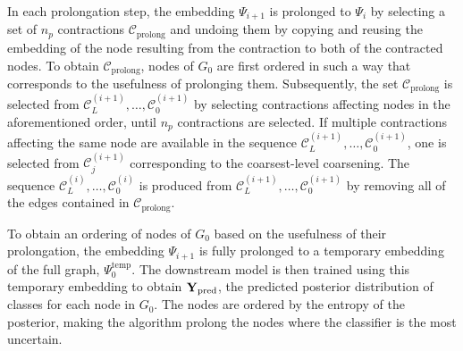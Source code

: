 In each prolongation step, the embedding \( \Psi_{i + 1} \) is prolonged to \( \Psi_i \) by selecting a set of \( n_p \) contractions \( \mathcal{C}_\mathrm{prolong} \) and undoing them by copying and reusing the embedding of the node resulting from the contraction to both of the contracted nodes. To obtain \( \mathcal{C}_\mathrm{prolong} \), nodes of \( G_0 \) are first ordered in such a way that corresponds to the usefulness of prolonging them. Subsequently, the set \( \mathcal{C}_\mathrm{prolong} \) is selected from \( \mathcal{C}_L^{(i + 1)}, \dots, \mathcal{C}_0^{(i + 1)} \) by selecting contractions affecting nodes in the aforementioned order, until \( n_p \) contractions are selected. If multiple contractions affecting the same node are available in the sequence \( \mathcal{C}_L^{(i + 1)}, \dots, \mathcal{C}_0^{(i + 1)} \), one is selected from \( \mathcal{C}_j^{(i + 1)} \) corresponding to the coarsest-level coarsening. The sequence \( \mathcal{C}_L^{(i)}, \dots, \mathcal{C}_0^{(i)} \) is produced from \( \mathcal{C}_L^{(i + 1)}, \dots, \mathcal{C}_0^{(i + 1)} \) by removing all of the edges contained in \( \mathcal{C}_\mathrm{prolong} \).

To obtain an ordering of nodes of \( G_0 \) based on the usefulness of their prolongation, the embedding \( \Psi_{i + 1} \) is fully prolonged to a temporary embedding of the full graph, \( \Psi_0^\mathrm{temp} \). The downstream model is then trained using this temporary embedding to obtain \( \mathbf{Y}_\mathrm{pred} \), the predicted posterior distribution of classes for each node in \( G_0 \). The nodes are ordered by the entropy of the posterior, making the algorithm prolong the nodes where the classifier is the most uncertain.
